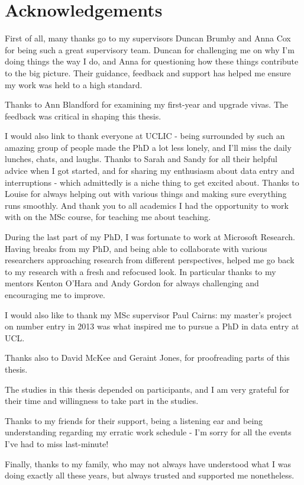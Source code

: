 \section*{Acknowledgements}

First of all, many thanks go to my supervisors Duncan Brumby and Anna Cox for being such a great supervisory team. Duncan for challenging me on why I'm doing things the way I do, and Anna for questioning how these things contribute to the big picture. Their guidance, feedback and support has helped me ensure my work was held to a high standard.


Thanks to Ann Blandford for examining my first-year and upgrade vivas. The feedback was critical in shaping this thesis.

I would also link to thank everyone at UCLIC - being surrounded by such an amazing group of people made the PhD a lot less lonely, and I'll miss the daily lunches, chats, and laughs. Thanks to Sarah and Sandy for all their helpful advice when I got started, and for sharing my enthusiasm about data entry and interruptions - which admittedly is a niche thing to get excited about.
Thanks to Louise for always helping out with various things and making sure everything runs smoothly.
And thank you to all academics I had the opportunity to work with on the MSc course, for teaching me about teaching.

During the last part of my PhD, I was fortunate to work at Microsoft Research. Having breaks from my PhD, and being able to collaborate with  various researchers approaching research from different perspectives, helped me go back to my research with a fresh and refocused look. In particular thanks to my mentors Kenton O'Hara and Andy Gordon for always challenging and encouraging me to improve. 

I would also like to thank my MSc supervisor Paul Cairns: my master's project on number entry in 2013 was what inspired me to pursue a PhD in data entry at UCL. 

Thanks also to David McKee and Geraint Jones, for proofreading parts of this thesis. 

The studies in this thesis depended on participants, and I am very grateful for their time and willingness to take part in the studies.

Thanks to my friends for their support, being a listening ear and being understanding regarding my erratic work schedule - I’m sorry for all the events I've had to miss last-minute!

Finally, thanks to my family, who may not always have understood what I was doing exactly all these years, but always trusted and supported me nonetheless.